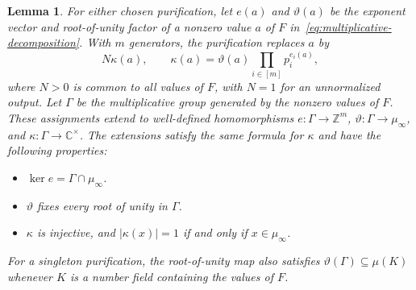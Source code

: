 \documentclass[11pt,letterpaper,onecolumn]{article}
\theoremstyle{plain}
\newtheorem{lemma}[lemma]{Lemma}
\theoremstyle{definition}
\theoremstyle{remark}
\begin{document}
\begin{lemma}
For either chosen purification, let $e(a)$ and $\vartheta(a)$ be the
exponent vector and root-of-unity factor of a nonzero value $a$ of $F$
in~\eqref{eq:multiplicative-decomposition}.  With $m$ generators, the
purification replaces $a$ by
\[
  N\kappa(a),\qquad
  \kappa(a)=\vartheta(a)\prod_{i\in[m]}p_i^{e_i(a)},
\]
where $N>0$ is common to all values of $F$, with $N=1$ for an
unnormalized output.
Let $\Gamma$ be the multiplicative group generated by the nonzero
values of $F$.  These assignments extend to well-defined homomorphisms
$e:\Gamma\to\mathbb Z^m$, $\vartheta:\Gamma\to\mu_\infty$, and
$\kappa:\Gamma\to\mathbb C^\times$.
The extensions satisfy the same formula for $\kappa$ and have the
following properties:
\begin{itemize}
  \item $\ker e=\Gamma\cap\mu_\infty$.
  \item $\vartheta$ fixes every root of unity in $\Gamma$.
  \item $\kappa$ is injective, and
        $|\kappa(x)|=1$ if and only if $x\in\mu_\infty$.
\end{itemize}
For a singleton purification, the root-of-unity map also satisfies
$\vartheta(\Gamma)\subseteq\mu(K)$ whenever $K$ is a number field
containing the values of $F$.
\end{lemma}
\end{document}
